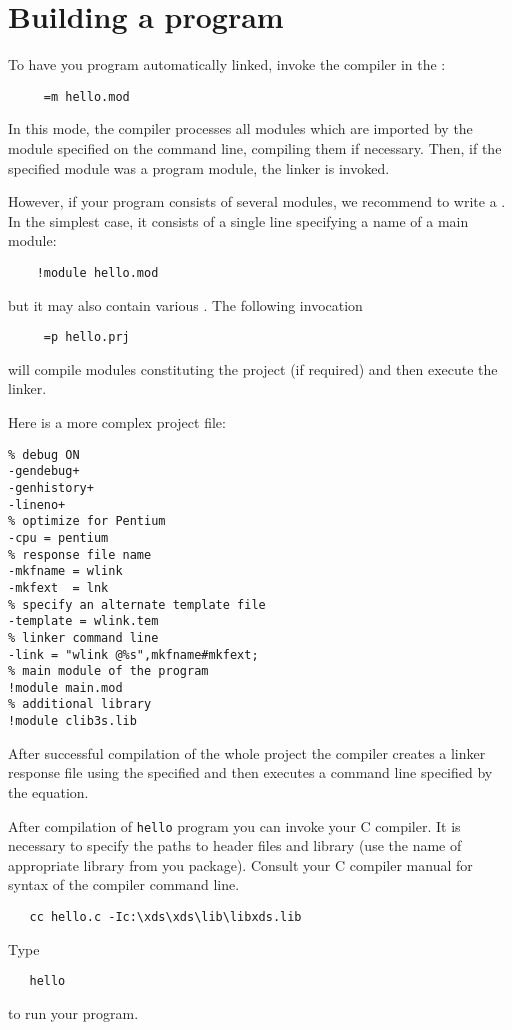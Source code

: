 \section{Building a program}\label{start:build}

\ifgencode        %

To have you program automatically linked, invoke the compiler in the
:

\verb'    '\xc\verb' =m hello.mod'

In this mode, the compiler processes all modules which are imported by
the module specified on the command line, compiling them if necessary.
Then, if the specified module was a program module, the linker is invoked.

However, if your program consists of several modules, we recommend to
write a . In the simplest case, it consists
of a single line specifying a name of a main module:

\verb'    !module hello.mod'

but it may also contain various .
The following invocation

\verb'    '{\tt \xc{}}\verb' =p hello.prj'

will compile modules constituting the project (if required) and
then execute the linker.

Here is a more complex project file:
\begin{verbatim}
% debug ON
-gendebug+
-genhistory+
-lineno+
% optimize for Pentium
-cpu = pentium
% response file name
-mkfname = wlink
-mkfext  = lnk
% specify an alternate template file
-template = wlink.tem
% linker command line
-link = "wlink @%s",mkfname#mkfext;
% main module of the program
!module main.mod
% additional library
!module clib3s.lib
\end{verbatim}

After successful compilation of the whole project the compiler
creates a linker response file using the specified
 and then executes a command line
specified by the  equation.

\fi %

\ifgenc %

 After compilation of {\tt hello} program you can invoke your C compiler.
 It is necessary to specify the paths to header files and library
 (use the name of appropriate library from you package).
 Consult your C compiler manual for syntax of the compiler command line.
 \begin{verbatim}
   cc hello.c -Ic:\xds\xds\lib\libxds.lib
 \end{verbatim}
 Type
 \begin{verbatim}
   hello
 \end{verbatim}
 to run your program.


